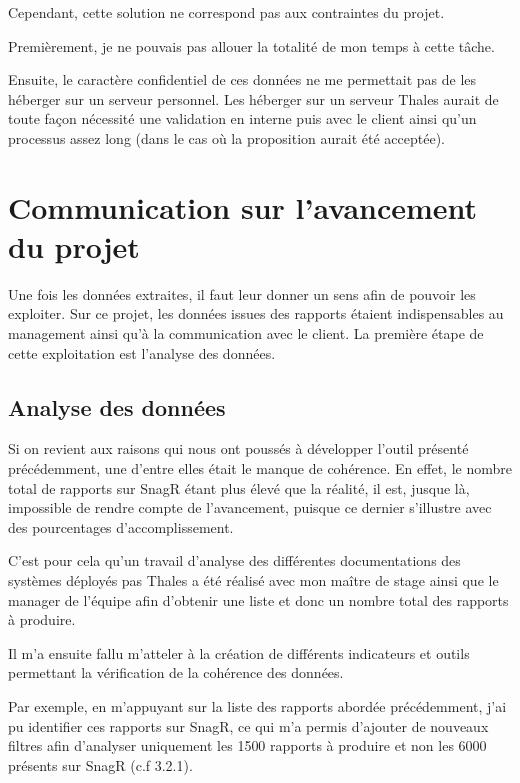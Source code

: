 Cependant, cette solution ne correspond pas aux contraintes du projet.

Premièrement, je ne pouvais pas allouer la totalité de mon temps à cette tâche.

Ensuite, le caractère confidentiel de ces données ne me permettait pas de les héberger sur un serveur personnel. Les héberger sur un serveur Thales aurait de toute façon nécessité une validation en interne puis avec le client ainsi qu'un processus assez long (dans le cas où la proposition aurait été acceptée).


\newpage
\section{Communication sur l'avancement du projet}

Une fois les données extraites, il faut leur donner un sens afin de pouvoir les exploiter. Sur ce projet, les données issues des rapports étaient indispensables au management ainsi qu'à la communication avec le client. La première étape de cette exploitation est l'analyse des données.

\subsection{Analyse des données}
Si on revient aux raisons qui nous ont poussés à développer l'outil présenté précédemment, une d'entre elles était le manque de cohérence.
En effet, le nombre total de rapports sur \gls{SnagR} étant plus élevé que la réalité, il est, jusque là, impossible de rendre compte de l'avancement, puisque ce dernier s'illustre avec des pourcentages d'accomplissement.

C'est pour cela qu'un travail d'analyse des différentes documentations des systèmes déployés pas Thales a été réalisé avec mon maître de stage ainsi que le manager de l'équipe afin d'obtenir une liste et donc un nombre total des rapports à produire.

Il m'a ensuite fallu m'atteler à la création de différents indicateurs et outils permettant la vérification de la cohérence des données. 

Par exemple, en m'appuyant sur la liste des rapports abordée précédemment, j'ai pu identifier ces rapports sur \gls{SnagR}, ce qui m'a permis d'ajouter de nouveaux filtres afin d'analyser uniquement les 1500 rapports à produire et non les 6000 présents sur \gls{SnagR} (c.f 3.2.1).

